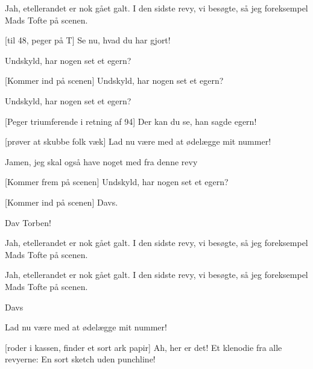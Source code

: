 \documentclass[a4paper,11pt]{article}
\begin{document}
\begin{sketch}
   Jah, etellerandet er nok gået galt. I den sidste revy, vi
  besøgte, så jeg foreksempel Mads Tofte på scenen.
  
   [til 48, peger på T] Se nu, hvad du har gjort!
  
   Undskyld, har nogen set et egern?
  
   [Kommer ind på scenen] Undskyld, har nogen set et egern?
  
   Undskyld, har nogen set et egern? 
  
   [Peger triumferende i retning af 94] Der kan du se, han
  sagde egern!
  
   [prøver at skubbe folk væk] Lad nu være med at ødelægge
  mit nummer!
  
   Jamen, jeg skal også have noget med fra denne revy
  
   [Kommer frem på scenen] Undskyld, har nogen set et egern?

   [Kommer ind på scenen] Davs.
  
   Dav Torben!

   Jah, etellerandet er nok gået galt. I den sidste revy, vi
  besøgte, så jeg foreksempel Mads Tofte på scenen.
  
   Jah, etellerandet er nok gået galt. I den sidste revy, vi
  besøgte, så jeg foreksempel Mads Tofte på scenen.

   Davs

   Lad nu være med at ødelægge mit nummer!

   [roder i kassen, finder et sort ark papir] Ah, her er det! Et klenodie
  fra alle revyerne: En sort sketch uden punchline!

  
\end{sketch}
\end{document}

